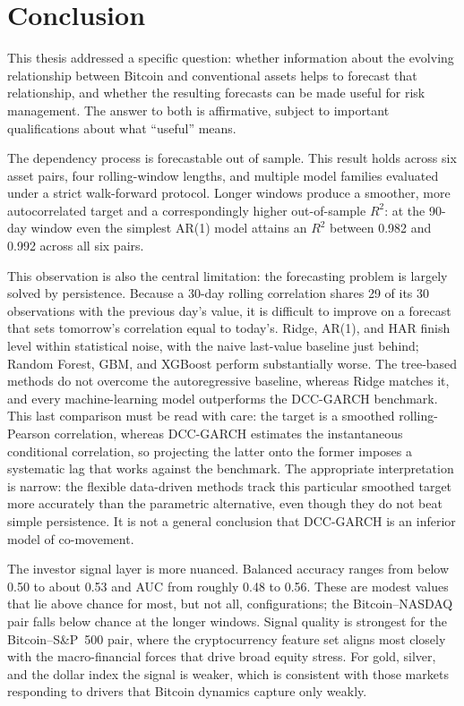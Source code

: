 \section{Conclusion}

This thesis addressed a specific question: whether information about the evolving relationship between Bitcoin and conventional assets helps to forecast that relationship, and whether the resulting forecasts can be made useful for risk management. The answer to both is affirmative, subject to important qualifications about what ``useful'' means.

The dependency process is forecastable out of sample. This result holds across six asset pairs, four rolling-window lengths, and multiple model families evaluated under a strict walk-forward protocol. Longer windows produce a smoother, more autocorrelated target and a correspondingly higher out-of-sample $R^2$: at the 90-day window even the simplest AR(1) model attains an $R^2$ between 0.982 and 0.992 across all six pairs.

This observation is also the central limitation: the forecasting problem is largely solved by persistence. Because a 30-day rolling correlation shares 29 of its 30 observations with the previous day's value, it is difficult to improve on a forecast that sets tomorrow's correlation equal to today's. Ridge, AR(1), and HAR finish level within statistical noise, with the naive last-value baseline just behind; Random Forest, GBM, and XGBoost perform substantially worse. The tree-based methods do not overcome the autoregressive baseline, whereas Ridge matches it, and every machine-learning model outperforms the DCC-GARCH benchmark. This last comparison must be read with care: the target is a smoothed rolling-Pearson correlation, whereas DCC-GARCH estimates the instantaneous conditional correlation, so projecting the latter onto the former imposes a systematic lag that works against the benchmark. The appropriate interpretation is narrow: the flexible data-driven methods track this particular smoothed target more accurately than the parametric alternative, even though they do not beat simple persistence. It is not a general conclusion that DCC-GARCH is an inferior model of co-movement.

The investor signal layer is more nuanced. Balanced accuracy ranges from below 0.50 to about 0.53 and AUC from roughly 0.48 to 0.56. These are modest values that lie above chance for most, but not all, configurations; the Bitcoin--NASDAQ pair falls below chance at the longer windows. Signal quality is strongest for the Bitcoin--S\&P~500 pair, where the cryptocurrency feature set aligns most closely with the macro-financial forces that drive broad equity stress. For gold, silver, and the dollar index the signal is weaker, which is consistent with those markets responding to drivers that Bitcoin dynamics capture only weakly.

